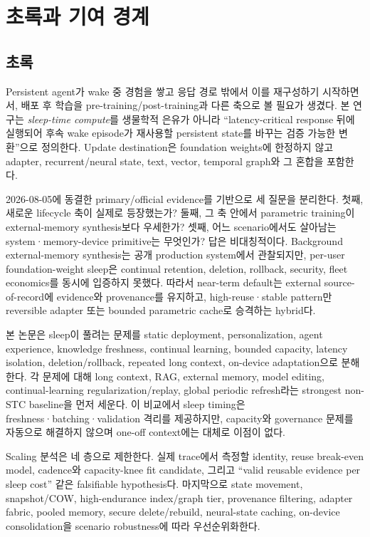\chapter{초록과 기여 경계}
\label{STC-S01}

\section*{초록}

Persistent agent가 wake 중 경험을 쌓고 응답 경로 밖에서 이를 재구성하기 시작하면서,
배포 후 학습을 pre-training/post-training과 다른 축으로 볼 필요가 생겼다. 본 연구는
\emph{sleep-time compute}를 생물학적 은유가 아니라 ``latency-critical response 뒤에 실행되어
후속 wake episode가 재사용할 persistent state를 바꾸는 검증 가능한 변환''으로 정의한다. Update
destination은 foundation weights에 한정하지 않고 adapter, recurrent/neural state, text, vector,
temporal graph와 그 혼합을 포함한다.

2026-08-05에 동결한 primary/official evidence를 기반으로 세 질문을 분리한다. 첫째, 새로운 lifecycle
축이 실제로 등장했는가? 둘째, 그 축 안에서 parametric training이 external-memory synthesis보다
우세한가? 셋째, 어느 scenario에서도 살아남는 system·memory-device primitive는 무엇인가? 답은
비대칭적이다. Background external-memory synthesis는 공개 production system에서 관찰되지만,
per-user foundation-weight sleep은 continual retention, deletion, rollback, security, fleet economics를
동시에 입증하지 못했다. 따라서 near-term default는 external source-of-record에 evidence와 provenance를
유지하고, high-reuse·stable pattern만 reversible adapter 또는 bounded parametric cache로 승격하는
hybrid다.

본 논문은 sleep이 풀려는 문제를 static deployment, personalization, agent experience, knowledge
freshness, continual learning, bounded capacity, latency isolation, deletion/rollback, repeated long context,
on-device adaptation으로 분해한다. 각 문제에 대해 long context, RAG, external memory, model editing,
continual-learning regularization/replay, global periodic refresh라는 strongest non-STC baseline을 먼저
세운다. 이 비교에서 sleep timing은 freshness·batching·validation 격리를 제공하지만, capacity와
governance 문제를 자동으로 해결하지 않으며 one-off context에는 대체로 이점이 없다.

Scaling 분석은 네 층으로 제한한다. 실제 trace에서 측정할 identity, reuse break-even model, cadence와
capacity-knee fit candidate, 그리고 ``valid reusable evidence per sleep cost'' 같은 falsifiable hypothesis다.
마지막으로 state movement, snapshot/COW, high-endurance index/graph tier, provenance filtering,
adapter fabric, pooled memory, secure delete/rebuild, neural-state caching, on-device consolidation을
scenario robustness에 따라 우선순위화한다.

